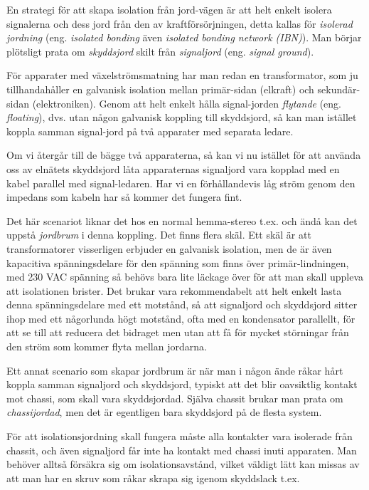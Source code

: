 En strategi för att skapa isolation från jord-vägen är att helt enkelt
isolera signalerna och dess jord från den av kraftförsörjningen, detta kallas
för \emph{isolerad jordning} (eng. \emph{isolated bonding} även \emph{isolated
bonding network (IBN)}). Man börjar plötsligt prata om \emph{skyddsjord}
skilt från \emph{signaljord} (eng. \emph{signal ground}).

För apparater med växelströmsmatning har man redan en transformator, som ju
tillhandahåller en galvanisk isolation mellan primär-sidan (elkraft) och
sekundär-sidan (elektroniken). Genom att helt enkelt hålla signal-jorden
\emph{flytande} (eng. \emph{floating}), dvs. utan någon galvanisk koppling
till skyddsjord, så kan man istället koppla samman signal-jord på två apparater
med separata ledare.

Om vi återgår till de bägge två apparaterna, så kan vi nu istället för att
använda oss av elnätets skyddsjord låta apparaternas signaljord vara kopplad
med en kabel parallel med signal-ledaren. Har vi en förhållandevis låg ström
genom den impedans som kabeln har så kommer det fungera fint.

Det här scenariot liknar det hos en normal hemma-stereo t.ex. och ändå kan det
uppstå \emph{jordbrum} i denna koppling. Det finns flera skäl. Ett skäl är att
transformatorer visserligen erbjuder en galvanisk isolation, men de är även
kapacitiva spänningsdelare för den spänning som finns över primär-lindningen,
med 230 VAC spänning så behövs bara lite läckage över för att man skall
uppleva att isolationen brister. Det brukar vara rekommendabelt att helt
enkelt lasta denna spänningsdelare med ett motstånd, så att signaljord och
skyddsjord sitter ihop med ett någorlunda högt motstånd, ofta med en
kondensator parallellt, för att se till att reducera det bidraget men utan att
få för mycket störningar från den ström som kommer flyta mellan jordarna.

Ett annat scenario som skapar jordbrum är när man i någon ände råkar hårt
koppla samman signaljord och skyddsjord, typiskt att det blir oavsiktlig
kontakt mot chassi, som skall vara skyddsjordad. Själva chassit brukar man
prata om \emph{chassijordad}, men det är egentligen bara skyddsjord på de
flesta system.

För att isolationsjordning skall fungera måste alla kontakter vara isolerade
från chassit, och även signaljord får inte ha kontakt med chassi inuti
apparaten. Man behöver alltså försäkra sig om isolationsavstånd, vilket
väldigt lätt kan missas av att man har en skruv som råkar skrapa sig igenom
skyddslack t.ex.

